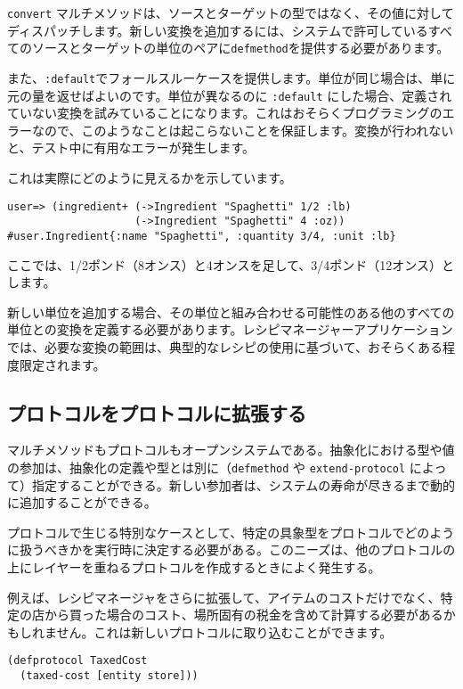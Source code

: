 \texttt{convert} マルチメソッドは、ソースとターゲットの型ではなく、その値に対してディスパッチします。新しい変換を追加するには、システムで許可しているすべてのソースとターゲットの単位のペアに\texttt{defmethod}を提供する必要があります。

また、\texttt{:default}でフォールスルーケースを提供します。単位が同じ場合は、単に元の量を返せばよいのです。単位が異なるのに \texttt{:default} にした場合、定義されていない変換を試みていることになります。これはおそらくプログラミングのエラーなので、このようなことは起こらないことを保証します。変換が行われないと、テスト中に有用なエラーが発生します。

これは実際にどのように見えるかを示しています。

\begin{lstlisting}[numbers=none]
user=> (ingredient+ (->Ingredient "Spaghetti" 1/2 :lb)
                    (->Ingredient "Spaghetti" 4 :oz))
#user.Ingredient{:name "Spaghetti", :quantity 3/4, :unit :lb}
\end{lstlisting}

ここでは、1/2ポンド（8オンス）と4オンスを足して、3/4ポンド（12オンス）とします。

新しい単位を追加する場合、その単位と組み合わせる可能性のある他のすべての単位との変換を定義する必要があります。レシピマネージャーアプリケーションでは、必要な変換の範囲は、典型的なレシピの使用に基づいて、おそらくある程度限定されます。

\subsection{プロトコルをプロトコルに拡張する}

マルチメソッドもプロトコルもオープンシステムである。抽象化における型や値の参加は、抽象化の定義や型とは別に（\texttt{defmethod} や \texttt{extend-protocol} によって）指定することができる。新しい参加者は、システムの寿命が尽きるまで動的に追加することができる。

プロトコルで生じる特別なケースとして、特定の具象型をプロトコルでどのように扱うべきかを実行時に決定する必要がある。このニーズは、他のプロトコルの上にレイヤーを重ねるプロトコルを作成するときによく発生する。

例えば、レシピマネージャをさらに拡張して、アイテムのコストだけでなく、特定の店から買った場合のコスト、場所固有の税金を含めて計算する必要があるかもしれません。これは新しいプロトコルに取り込むことができます。

\begin{lstlisting}[numbers=none]
(defprotocol TaxedCost
  (taxed-cost [entity store]))
\end{lstlisting}

